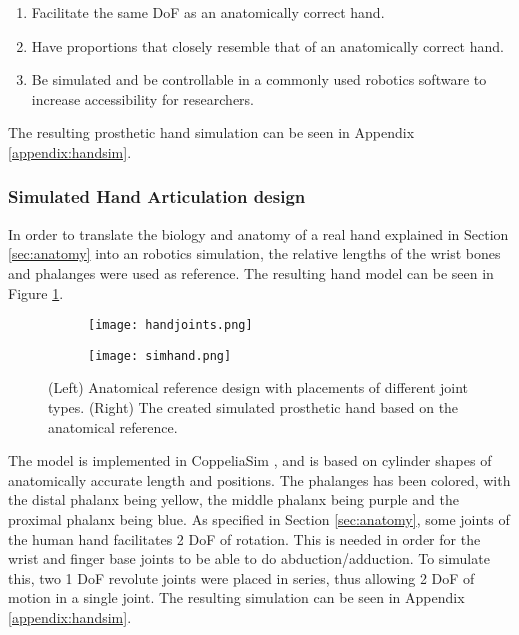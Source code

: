 \documentclass[../main.tex]{subfiles}
\begin{document}
\begin{enumerate}
\item Facilitate the same DoF as an anatomically correct hand.
\item Have proportions that closely resemble that of an anatomically correct hand.
\item Be simulated and be controllable in a commonly used robotics software to increase accessibility for researchers.
\end{enumerate}

The resulting prosthetic hand simulation can be seen in Appendix \ref{appendix:handsim}.

\subsubsection{Simulated Hand Articulation design}

In order to translate the biology and anatomy of a real hand explained in Section \ref{sec:anatomy} into an robotics simulation, the relative lengths of the wrist bones and phalanges were used as reference.
The resulting hand model can be seen in Figure \ref{fig:simdesignandimpl}.

\begin{figure}
    \centering
    \begin{subfigure}[b]{0.49\textwidth}
        \centering
        \texttt{[image: handjoints.png]}
    \end{subfigure}
    \hfill
    \centering
    \begin{subfigure}[b]{0.49\textwidth}
        \centering
        \texttt{[image: simhand.png]}
    \end{subfigure}
    \caption{(Left) Anatomical reference design with placements of different joint types. (Right) The  created simulated prosthetic hand based on the anatomical reference.}
    \label{fig:simdesignandimpl}
\end{figure}

The model is implemented in CoppeliaSim \cite{coppeliasim}, and is based on cylinder shapes of anatomically accurate length and positions.
The \gls{phalanges} has been colored, with the \gls{distal phalanx} being yellow, the \gls{middle phalanx} being purple and the \gls{proximal phalanx} being blue.
As specified in Section \ref{sec:anatomy}, some joints of the human hand facilitates 2 \gls{DoF} of rotation.
This is needed in order for the wrist and finger base joints to be able to do \gls{abduction/adduction}.
To simulate this, two 1 \gls{DoF} revolute joints were placed in series, thus allowing 2 \gls{DoF} of motion in a single joint.
The resulting simulation can be seen in Appendix \ref{appendix:handsim}.

\end{document}
